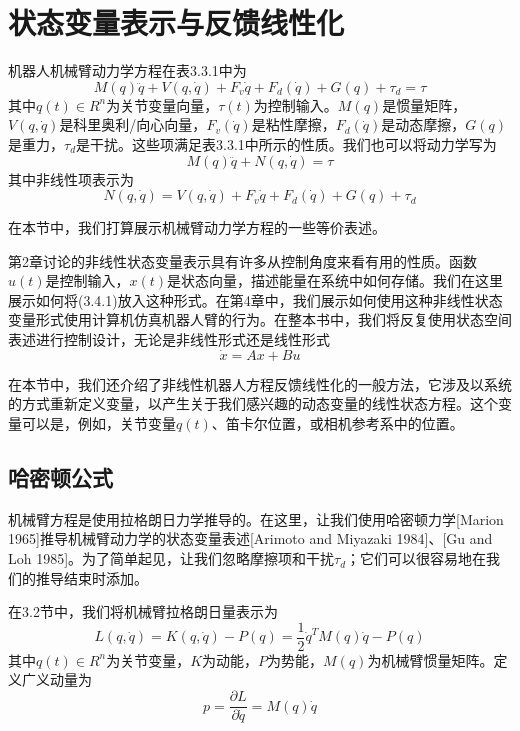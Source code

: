 \documentclass[12pt,a4paper]{ctexart}
\begin{document}
\section{状态变量表示与反馈线性化}

机器人机械臂动力学方程在表3.3.1中为
\begin{equation}
M(q)\ddot{q} + V(q,\dot{q}) + F_v\dot{q} + F_d(\dot{q}) + G(q) + \tau_d = \tau
\end{equation}
其中$q(t) \in R^n$为关节变量向量，$\tau(t)$为控制输入。$M(q)$是惯量矩阵，$V(q,\dot{q})$是科里奥利/向心向量，$F_v(\dot{q})$是粘性摩擦，$F_d(\dot{q})$是动态摩擦，$G(q)$是重力，$\tau_d$是干扰。这些项满足表3.3.1中所示的性质。我们也可以将动力学写为
\begin{equation}
M(q)\ddot{q} + N(q,\dot{q}) = \tau
\end{equation}
其中非线性项表示为
\begin{equation}
N(q,\dot{q}) = V(q,\dot{q}) + F_v\dot{q} + F_d(\dot{q}) + G(q) + \tau_d
\end{equation}

在本节中，我们打算展示机械臂动力学方程的一些等价表述。

第2章讨论的非线性状态变量表示具有许多从控制角度来看有用的性质。函数$u(t)$是控制输入，$x(t)$是状态向量，描述能量在系统中如何存储。我们在这里展示如何将(3.4.1)放入这种形式。在第4章中，我们展示如何使用这种非线性状态变量形式使用计算机仿真机器人臂的行为。在整本书中，我们将反复使用状态空间表述进行控制设计，无论是非线性形式还是线性形式
\begin{equation}
\dot{x} = Ax + Bu
\end{equation}

在本节中，我们还介绍了非线性机器人方程反馈线性化的一般方法，它涉及以系统的方式重新定义变量，以产生关于我们感兴趣的动态变量的线性状态方程。这个变量可以是，例如，关节变量$q(t)$、笛卡尔位置，或相机参考系中的位置。

\subsection{哈密顿公式}

机械臂方程是使用拉格朗日力学推导的。在这里，让我们使用哈密顿力学[Marion 1965]推导机械臂动力学的状态变量表述[Arimoto and Miyazaki 1984]、[Gu and Loh 1985]。为了简单起见，让我们忽略摩擦项和干扰$\tau_d$；它们可以很容易地在我们的推导结束时添加。

在3.2节中，我们将机械臂拉格朗日量表示为
\begin{equation}
L(q,\dot{q}) = K(q,\dot{q}) - P(q) = \frac{1}{2}\dot{q}^T M(q)\dot{q} - P(q)
\end{equation}
其中$q(t) \in R^n$为关节变量，$K$为动能，$P$为势能，$M(q)$为机械臂惯量矩阵。定义广义动量为
\begin{equation}
p = \frac{\partial L}{\partial \dot{q}} = M(q)\dot{q}
\end{equation}
\end{document}
